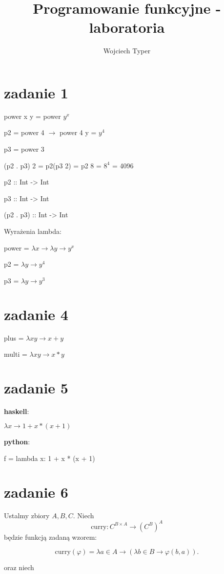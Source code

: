 \documentclass[11pt,a4paper]{article}
\title{Programowanie funkcyjne - laboratoria}
\author{Wojciech Typer}
\date{}
\begin{document}
\maketitle

\section*{zadanie 1}
power x y = power $y^x$

p2 = power 4 $\rightarrow$ power 4 y = $y^4$

p3 = power 3

(p2 . p3) 2 = p2(p3 2) = p2 8 = $8^4$ = 4096

p2 :: Int -> Int

p3 :: Int -> Int

(p2 . p3) :: Int -> Int

Wyrażenia lambda:

power = $\lambda x \rightarrow \lambda y \rightarrow y ^ x$

p2 = $\lambda y \rightarrow y ^ 4$

p3 = $\lambda y \rightarrow y ^ 3$

\bigskip

\section*{zadanie 4}
plus = $\lambda x y \rightarrow x + y$

multi = $\lambda x y \rightarrow x * y$

\bigskip

\section*{zadanie 5}
\textbf{haskell}:

$\lambda x \rightarrow 1 + x * (x + 1)$

\textbf{python}:

f = lambda x: 1 + x * (x + 1)

\bigskip

\section*{zadanie 6}
Ustalmy zbiory \( A, B, C \). Niech
\[
\text{curry} : C^{B \times A} \to (C^B)^A
\]
będzie funkcją zadaną wzorem:

\[
\text{curry}(\varphi) = \lambda a \in A \to (\lambda b \in B \to \varphi(b, a)).
\]

oraz niech
\end{document}
